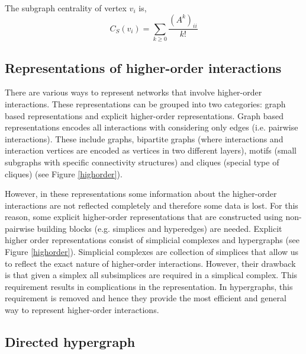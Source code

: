 \documentclass[a4paper,12pt]{article}
\theoremstyle{definition}
\theoremstyle{remark}
\begin{document}
The subgraph centrality \cite{Estrada05} of vertex $v_i$ is,
\[C_S(v_i) = \sum_{k\ge 0 } \frac{(A^k)_{ii}}{k!}\]

\subsection{Representations of higher-order interactions}
There are various ways to represent networks that involve higher-order interactions. These representations can be grouped into two categories: graph based representations and explicit higher-order representations. Graph based representations encodes all interactions with considering only edges (i.e. pairwise interactions). These include graphs, bipartite graphs (where interactions and interaction vertices are encoded as vertices in two different layers), motifs (small subgraphs with specific connectivity structures) and cliques (special type of cliques) (see Figure \ref{highorder}). 

However, in these representations some information about the higher-order interactions are not reflected completely and therefore some data is lost. For this reason, some explicit higher-order representations that are constructed using non-pairwise building blocks (e.g. simplices and hyperedges) are needed. Explicit higher order representations consist of simplicial complexes and hypergraphs (see Figure \ref{highorder}). Simplicial complexes are collection of simplices that allow us to reflect the exact nature of higher-order interactions. However, their drawback is that given a simplex all subsimplices are required in a simplical complex. This requirement results in complications in the representation. In hypergraphs, this requirement is removed and hence they provide the most efficient and general way to represent higher-order interactions.   

\subsection{Directed hypergraph}
\end{document}

